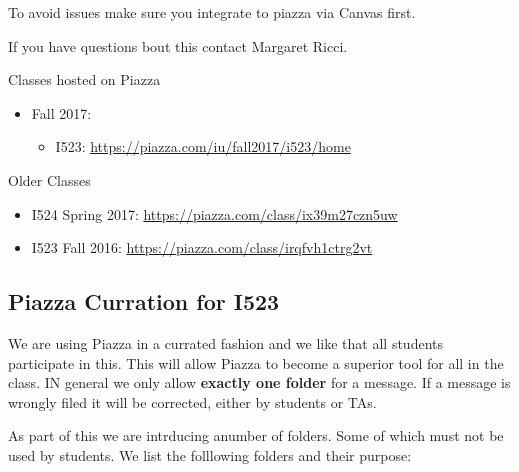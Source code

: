 To avoid issues make sure you integrate to piazza via Canvas first.

If you have questions bout this contact Margaret Ricci.

Classes hosted on Piazza

\begin{itemize}
\tightlist
\item
  Fall 2017:

  \begin{itemize}
  \tightlist
  \item
    I523: \url{https://piazza.com/iu/fall2017/i523/home}
  \end{itemize}
\end{itemize}

Older Classes

\begin{itemize}
\tightlist
\item
  I524 Spring 2017: \url{https://piazza.com/class/ix39m27czn5uw}
\item
  I523 Fall 2016: \url{https://piazza.com/class/irqfvh1ctrg2vt}
\end{itemize}

\subsection{Piazza Curration for I523}\label{piazza-curration-for-i523}

We are using Piazza in a currated fashion and we like that all students
participate in this. This will allow Piazza to become a superior tool
for all in the class. IN general we only allow \textbf{exactly one
folder} for a message. If a message is wrongly filed it will be
corrected, either by students or TAs.

As part of this we are intrducing anumber of folders. Some of which must
not be used by students. We list the folllowing folders and their
purpose:


